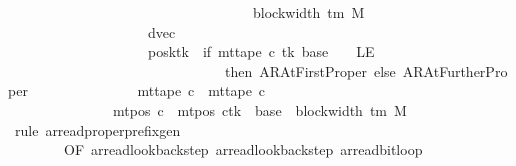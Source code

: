 \begin{isabellebody}
\ \ \ \ \ \ \ \ \ \ \ \ \ \ \ \ \ \ \ \ \ \ \ \ \ \ \ \ \ \ \ \ \ \ \ {\isacharbrackleft}{\kern0pt}{}{\isachardot}{\kern0pt}{\isachardot}{\kern0pt}{\isacharless}{\kern0pt}block{\isacharunderscore}{\kern0pt}width\ {\isacharparenleft}{\kern0pt}{\isasymGamma}{\isacharunderscore}{\kern0pt}tm\ M{\isacharparenright}{\kern0pt}\ {\isacharminus}{\kern0pt}\ {}{\isacharbrackright}{\kern0pt}{\isacharparenright}{\kern0pt}{\isacharparenright}{\kern0pt}{\isacharcomma}{\kern0pt}\isanewline
\ \ \ \ \ \ \ \ \ \ \ \ \ \ \ \ \ \ \ \ dvec{\isacharcomma}{\kern0pt}\isanewline
\ \ \ \ \ \ \ \ \ \ \ \ \ \ \ \ \ \ \ \ posk{\isacharparenleft}{\kern0pt}tk\ {\isacharcolon}{\kern0pt}{\isacharequal}{\kern0pt}\ if\ mt{\isacharunderscore}{\kern0pt}tape\ c{\isacharprime}{\kern0pt}\ tk\ {\isacharparenleft}{\kern0pt}base\ {\isacharminus}{\kern0pt}\ {}{\isacharparenright}{\kern0pt}\ {\isacharequal}{\kern0pt}\ LE{}\isanewline
\ \ \ \ \ \ \ \ \ \ \ \ \ \ \ \ \ \ \ \ \ \ \ \ \ \ \ \ \ \ \ then\ AR{\isacharunderscore}{\kern0pt}AtFirstProper\ else\ AR{\isacharunderscore}{\kern0pt}AtFurtherProper{\isacharparenright}{\kern0pt}{\isacharparenright}{\kern0pt}\isanewline
\ \ \ \ \ \ \ \ \ \ \ \ \ \ {\isasymand}\ mt{\isacharunderscore}{\kern0pt}tape\ c{\isacharprime}{\kern0pt}{\isacharprime}{\kern0pt}\ {\isacharequal}{\kern0pt}\ mt{\isacharunderscore}{\kern0pt}tape\ c{\isacharprime}{\kern0pt}\isanewline
\ \ \ \ \ \ \ \ \ \ \ \ \ \ {\isasymand}\ mt{\isacharunderscore}{\kern0pt}pos\ c{\isacharprime}{\kern0pt}{\isacharprime}{\kern0pt}\ {\isacharequal}{\kern0pt}\ {\isacharparenleft}{\kern0pt}mt{\isacharunderscore}{\kern0pt}pos\ c{\isacharprime}{\kern0pt}{\isacharparenright}{\kern0pt}{\isacharparenleft}{\kern0pt}tk\ {\isacharcolon}{\kern0pt}{\isacharequal}{\kern0pt}\ base\ {\isacharplus}{\kern0pt}\ {\isacharparenleft}{\kern0pt}block{\isacharunderscore}{\kern0pt}width\ {\isacharparenleft}{\kern0pt}{\isasymGamma}{\isacharunderscore}{\kern0pt}tm\ M{\isacharparenright}{\kern0pt}\ {\isacharminus}{\kern0pt}\ {}{\isacharparenright}{\kern0pt}{\isacharparenright}{\kern0pt}{\isachardoublequoteclose}\isanewline
%
\isadelimproof
\ \ %
\endisadelimproof
%
\isatagproof
{}\isamarkupfalse%
\ {\isacharparenleft}{\kern0pt}rule\ ar{\isacharunderscore}{\kern0pt}read{\isacharunderscore}{\kern0pt}proper{\isacharunderscore}{\kern0pt}prefix{\isacharunderscore}{\kern0pt}gen\isanewline
\ \ \ \ \ \ \ \ {\isacharbrackleft}{\kern0pt}OF\ ar{\isacharunderscore}{\kern0pt}read{\isacharunderscore}{\kern0pt}lookback{}{\isacharunderscore}{\kern0pt}step\ ar{\isacharunderscore}{\kern0pt}read{\isacharunderscore}{\kern0pt}lookback{}{\isacharunderscore}{\kern0pt}step\ ar{\isacharunderscore}{\kern0pt}read{\isacharunderscore}{\kern0pt}bit{\isacharunderscore}{\kern0pt}loop\isanewline

\end{isabellebody}
